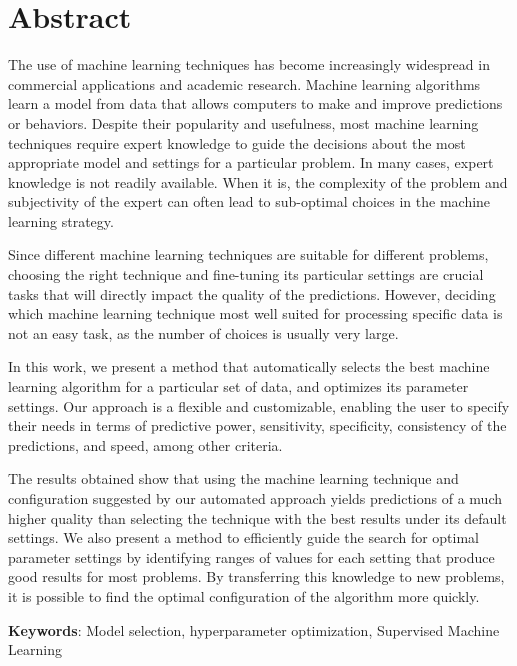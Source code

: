 \cleardoublepage
\chapter*{Abstract}

The use of machine learning techniques has become increasingly widespread in commercial applications and academic research. Machine learning algorithms learn a model from data that allows computers to make and improve predictions or behaviors.  Despite their popularity and usefulness, most machine learning techniques require expert knowledge to guide the decisions about the most appropriate model and settings for a particular problem. In many cases, expert knowledge is not readily available. When it is, the complexity of the problem and subjectivity of the expert can often lead to sub-optimal choices in the machine learning strategy.

\vskip0.2cm
Since different machine learning techniques are suitable for different problems, choosing the right technique and fine-tuning its particular settings are crucial tasks that will directly impact the quality of the predictions. However, deciding which machine learning technique most well suited for processing specific data is not an easy task, as the number of choices is usually very large.

\vskip0.2cm
In this work, we present a method that automatically selects the best machine learning algorithm for a particular set of data, and optimizes its parameter settings. Our approach is a flexible and customizable, enabling the user to specify their needs in terms of predictive power, sensitivity, specificity, consistency of the predictions, and speed, among other criteria.

\vskip0.2cm
The results obtained show that using the machine learning technique and configuration suggested by our automated approach yields predictions of a much higher quality than selecting the technique with the best results under its default settings. We also present a method to efficiently guide the search for optimal parameter settings by identifying ranges of values for each setting that produce good results for most problems. By transferring this knowledge to new problems, it is possible to find the optimal configuration of the algorithm more quickly.

\vskip0.5cm
{\bf Keywords}:
Model selection, hyperparameter optimization, Supervised Machine Learning

